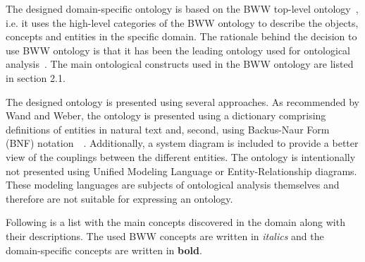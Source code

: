 \documentclass[parskip=full]{uvamscse}
\begin{document}
The designed domain-specific ontology is based on the BWW top-level
ontology~\cite{wand1990ontological}, i.e. it uses the high-level categories of the BWW ontology to
describe the objects, concepts and entities in the specific domain. The rationale behind the
decision to use BWW ontology is that it has been the leading ontology used for ontological
analysis~\cite{moody2009physics}. The main ontological constructs used in the BWW ontology are
listed in section 2.1.

The designed ontology is presented using several approaches. As recommended by Wand and Weber, the
ontology is presented using a dictionary comprising definitions of entities in natural text and,
second, using Backus-Naur Form (BNF) notation~\cite{wand1995deep}~\cite{rosemann2002developing}.
Additionally, a system diagram is included to provide a better view of the couplings between the
different entities. The ontology is intentionally not presented using Unified Modeling Language or
Entity-Relationship diagrams. These modeling languages are subjects of ontological analysis
themselves and therefore are not suitable for expressing an ontology.

Following is a list with the main concepts discovered in the domain along with their descriptions.
The used BWW concepts are written in \textit{italics} and the domain-specific concepts are written
in \textbf{bold}.
\end{document}
